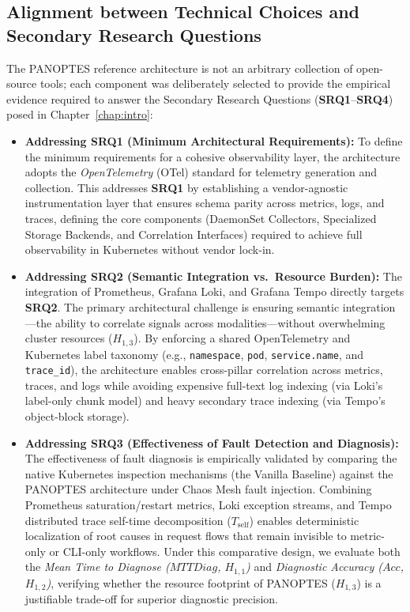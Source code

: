 \subsection{Alignment between Technical Choices and Secondary Research Questions}
\label{subsec:align-tech-rqs}

The PANOPTES reference architecture is not an arbitrary collection of open-source tools; each component was deliberately selected to provide the empirical evidence required to answer the Secondary Research Questions (\textbf{SRQ1}--\textbf{SRQ4}) posed in Chapter~\ref{chap:intro}:

\begin{itemize}
    \item \textbf{Addressing SRQ1 (Minimum Architectural Requirements):} To define the minimum requirements for a cohesive observability layer, the architecture adopts the \textit{OpenTelemetry} (OTel) standard for telemetry generation and collection. This addresses \textbf{SRQ1} by establishing a vendor-agnostic instrumentation layer that ensures schema parity across metrics, logs, and traces, defining the core components (DaemonSet Collectors, Specialized Storage Backends, and Correlation Interfaces) required to achieve full observability in Kubernetes without vendor lock-in.

    \item \textbf{Addressing SRQ2 (Semantic Integration vs.\ Resource Burden):} The integration of Prometheus, Grafana Loki, and Grafana Tempo directly targets \textbf{SRQ2}. The primary architectural challenge is ensuring semantic integration---the ability to correlate signals across modalities---without overwhelming cluster resources ($H_{1,3}$). By enforcing a shared OpenTelemetry and Kubernetes label taxonomy (e.g., \texttt{namespace}, \texttt{pod}, \texttt{service.name}, and \texttt{trace\_id}), the architecture enables cross-pillar correlation across metrics, traces, and logs while avoiding expensive full-text log indexing (via Loki's label-only chunk model) and heavy secondary trace indexing (via Tempo's object-block storage).

    \item \textbf{Addressing SRQ3 (Effectiveness of Fault Detection and Diagnosis):} The effectiveness of fault diagnosis is empirically validated by comparing the native Kubernetes inspection mechanisms (the Vanilla Baseline) against the PANOPTES architecture under Chaos Mesh fault injection. Combining Prometheus saturation/restart metrics, Loki exception streams, and Tempo distributed trace self-time decomposition ($T_{\text{self}}$) enables deterministic localization of root causes in request flows that remain invisible to metric-only or CLI-only workflows. Under this comparative design, we evaluate both the \textit{Mean Time to Diagnose ($MTTDiag$, $H_{1,1}$)} and \textit{Diagnostic Accuracy ($Acc$, $H_{1,2}$)}, verifying whether the resource footprint of PANOPTES ($H_{1,3}$) is a justifiable trade-off for superior diagnostic precision.


\end{itemize}
